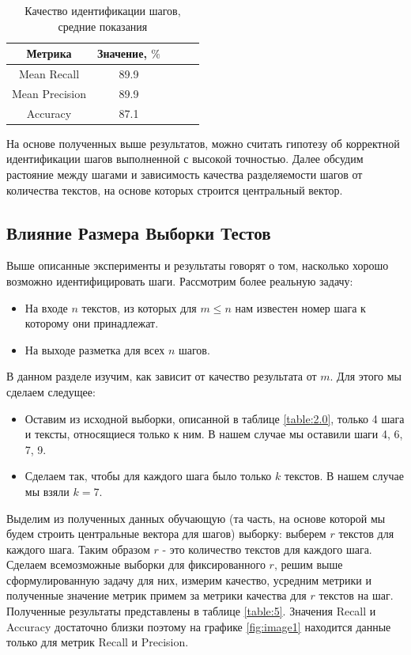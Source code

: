 \documentclass[12pt]{article}
\begin{document}
\begin{table}[h!]
\centering
\begin{tabular}{||c|c|c|c|c||} 
 \hline
 Метрика& Значение, $\%$\\
 \hline
Mean Recall&89.9\\
\hline
Mean Precision&89.9\\
\hline
Accuracy&87.1\\
\hline
 \hline
\end{tabular}
\caption{Качество идентификации шагов, средние показания}
\label{table:3}
\end{table}

На основе полученных выше результатов, можно считать гипотезу об корректной идентификации шагов выполненной с высокой точностью. Далее обсудим растояние между шагами и зависимость качества разделяемости шагов от количества текстов, на основе которых строится центральный вектор.

\subsection{Влияние Размера Выборки Тестов}

Выше описанные эксперименты и результаты говорят о том, насколько хорошо возможно идентифицировать шаги. Рассмотрим более реальную задачу:

\begin{itemize}
	\item На входе $n$ текстов, из которых для $m\leq n$ нам известен номер шага к которому они принадлежат.
	\item На выходе разметка для всех $n$ шагов.
\end{itemize}

В данном разделе изучим, как зависит от качество результата от $m$. Для этого мы сделаем следущее:
\begin{itemize}
	\item Оставим из исходной выборки, описанной в таблице \ref{table:2.0}, только 4 шага и тексты, относящиеся только к ним. В нашем случае мы оставили шаги 4, 6, 7, 9.
	\item Сделаем так, чтобы для каждого шага было только $k$ текстов. В нашем случае мы взяли $k=7$.
\end{itemize}
Выделим из полученных данных обучающую (та часть, на основе которой мы будем строить центральные вектора для шагов) выборку: выберем $r$ текстов для каждого шага. Таким образом $r$ - это количество текстов для каждого шага. Сделаем всемозможные выборки для фиксированного $r$, решим выше сформулированную задачу для них, измерим качество, усредним метрики и полученные значение метрик примем за метрики качества для $r$ текстов на шаг. Полученные результаты представлены в таблице \ref{table:5}. Значения Recall и Accuracy достаточно близки поэтому на графике \ref{fig:image1} находится данные только для метрик Recall и Precision.
\end{document}

